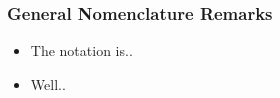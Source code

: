 \subsubsection*{General Nomenclature Remarks}
\begin{itemize}
\item The notation is..
\item Well..
\end{itemize}